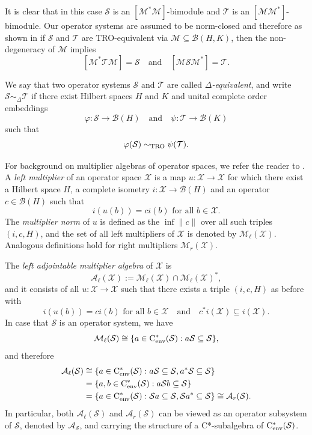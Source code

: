 \documentclass[11pt]{amsart}
\numberwithin{equation}{section}
\theoremstyle{plain}
\theoremstyle{definition}
\theoremstyle{remark}
\newcommand{\A}{{\mathcal{A}}}
\newcommand{\B}{{\mathcal{B}}}
\newcommand{\M}{{\mathcal{M}}}
\renewcommand{\S}{{\mathcal{S}}}
\newcommand{\T}{{\mathcal{T}}}
\newcommand{\X}{{\mathcal{X}}}
\def\De{\Delta}
\newcommand{\foral}{\text{ for all }}
\newcommand{\qand}{\quad\text{and}\quad}
\newcommand{\cenv}{\mathrm{C}^*_{\textup{env}}}
\begin{document}
It is clear that in this case $\S $ is an $[\M^*\M]$-bimodule and $ \T$ is an $[\M\M^*]$-bimodule.
Our operator systems are assumed to be norm-closed and therefore as shown in \cite[Proposition 3.3]{EKT21} if $\S$ and $\T$ are TRO-equivalent via $\M \subseteq \B(H,K)$, then the non-degeneracy of $\M$ implies
\[
[\M^* \T \M] = \S
\qand
[\M \S \M^*] = \T.
\]

We say that two operator systems $\S$ and $\T$ are called \emph{$\De$-equivalent},
and write $\S \sim_{\De} \T$ if there exist Hilbert spaces $H$ and $K$ 
and unital complete order embeddings 
\[
\varphi \colon \S \to \B(H)
\qand
\psi\colon \T \to \B(K)
\]
such that 
\[
\varphi(\S) \sim_{\rm TRO} \psi(\T).
\]

For background on multiplier algebras of operator spaces, we refer the reader to \cite{BL04}.
A \emph{left multiplier} of an operator space $\X$ is a map $u \colon \X\to \X$ for which there exist a Hilbert space $H$, a complete isometry $i \colon \X\to \B(H)$ and an operator $c\in \B(H)$ such that
\[
i(u(b))=c  i(b) \foral b\in \X.
\]
The \textit{multiplier norm} of $u$ is defined as the $\inf{\|c\|}$ over all such triples $(i,c,H)$, and the set of all left multipliers of $\X$ is denoted by $\M_\ell(\X)$. Analogous definitions hold for right multipliers $\M_r(\X)$.

The \textit{left adjointable multiplier algebra} of $\X$ is 
\[
\A_\ell(\X):=\M_\ell(\X)\cap \M_\ell(\X)^*,
\]
and it consists of all $u \colon \X\to \X$ such that there exists a triple $(i,c,H)$ as before with 
\[
i(u(b))=ci(b) \foral b\in \X
\qand 
c^*i(\X)\subseteq i(\X).
\]
In case that $\S$ is an operator system, we have 
\[
\M_\ell(\S)\cong \{a\in \cenv(\S):a\S\subseteq \S\},
\]
and therefore
\begin{align*}
\A_\ell(\S) 
&\cong 
\{a\in \cenv(\S):a\S\subseteq\S,a^*\S\subseteq\S\}\\
&=
\{a,b\in \cenv(\S):a\S b\subseteq \S\}\\
&=
\{a\in \cenv(\S):\S a\subseteq\S,\S a^*\subseteq\S\}
\cong 
\A_r(\S).
\end{align*}
In particular, both $\A_\ell(\S)$ and $\A_r(\S)$ can be viewed as an operator subsystem of $\S$, denoted by $\A_\S$, and carrying the structure of a C*-subalgebra of $\cenv(\S)$.
\end{document}
